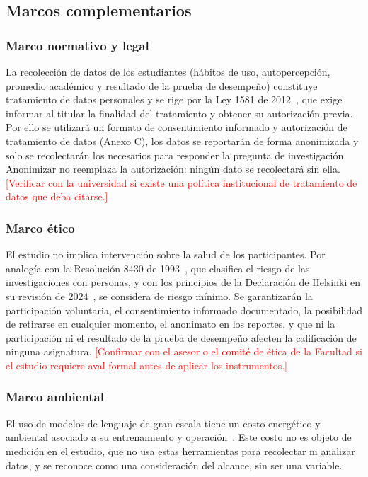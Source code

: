 \documentclass[12pt,letterpaper]{article}
\numberwithin{table}{section}
\numberwithin{figure}{section}
\newcommand{\pendiente}[1]{\textcolor{red}{[#1]}}
\begin{document}
\subsection{Marcos complementarios}

\subsubsection{Marco normativo y legal}

La recolección de datos de los estudiantes (hábitos de uso, autopercepción, promedio académico y resultado de la prueba de desempeño) constituye tratamiento de datos personales y se rige por la Ley 1581 de 2012~\cite{ley1581colombia}, que exige informar al titular la finalidad del tratamiento y obtener su autorización previa. Por ello se utilizará un formato de consentimiento informado y autorización de tratamiento de datos (Anexo C), los datos se reportarán de forma anonimizada y solo se recolectarán los necesarios para responder la pregunta de investigación. Anonimizar no reemplaza la autorización: ningún dato se recolectará sin ella. \pendiente{Verificar con la universidad si existe una política institucional de tratamiento de datos que deba citarse.}

\subsubsection{Marco ético}

El estudio no implica intervención sobre la salud de los participantes. Por analogía con la Resolución 8430 de 1993~\cite{resolucion8430colombia}, que clasifica el riesgo de las investigaciones con personas, y con los principios de la Declaración de Helsinki en su revisión de 2024~\cite{wma2024helsinki}, se considera de riesgo mínimo. Se garantizarán la participación voluntaria, el consentimiento informado documentado, la posibilidad de retirarse en cualquier momento, el anonimato en los reportes, y que ni la participación ni el resultado de la prueba de desempeño afecten la calificación de ninguna asignatura. \pendiente{Confirmar con el asesor o el comité de ética de la Facultad si el estudio requiere aval formal antes de aplicar los instrumentos.}

\subsubsection{Marco ambiental}

El uso de modelos de lenguaje de gran escala tiene un costo energético y ambiental asociado a su entrenamiento y operación~\cite{strubell2019energy}. Este costo no es objeto de medición en el estudio, que no usa estas herramientas para recolectar ni analizar datos, y se reconoce como una consideración del alcance, sin ser una variable.
\end{document}
